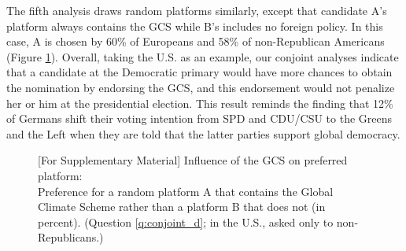 \clearpage 
\noindent 
The fifth analysis draws random platforms similarly, except that candidate A's platform always contains the GCS while B's includes no foreign policy. In this case, A is chosen by 60\% of Europeans %
and 58\% of non-Republican Americans (Figure \ref{fig:conjoint_left_ag_b}). %
Overall, taking the U.S. as an example, our conjoint analyses indicate that a candidate at the Democratic primary would have more chances to obtain the nomination by endorsing the GCS, and this endorsement would not penalize her or him at the presidential election. This result reminds the finding that 12\% of Germans shift their voting intention from SPD and CDU/CSU to the Greens and the Left when they are told that the latter parties support global democracy.\citep{ghassim_who_2020}


\begin{figure}[h!]
    \caption[Influence of the GCS on preferred platform]{[For Supplementary Material] Influence of the GCS on preferred platform:\\ Preference for a random platform A that contains the Global Climate Scheme rather than a platform B that does not (in percent). (Question \ref{q:conjoint_d}; in the U.S., asked only to non-Republicans.)}\label{fig:conjoint_left_ag_b}
\end{figure}




